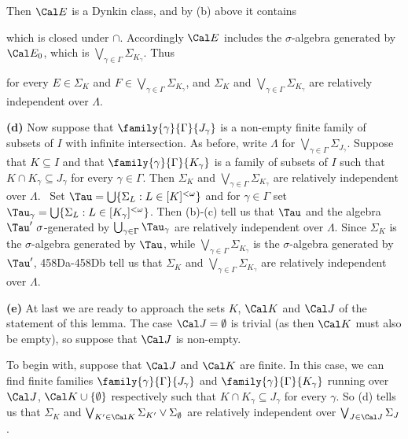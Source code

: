 {\noindent Then $\Cal E$ is a Dynkin class, and by (b) above it contains


\noindent which is closed under $\cap$.
Accordingly $\Cal E$ includes the $\sigma$-algebra generated by
$\Cal E_0$, which is $\bigvee_{\gamma\in\Gamma}\Sigma_{K_{\gamma}}$.
Thus


\noindent for every $E\in\Sigma_K$ and
$F\in\bigvee_{\gamma\in\Gamma}\Sigma_{K_{\gamma}}$, and
$\Sigma_K$ and
$\bigvee_{\gamma\in\Gamma}\Sigma_{K_{\gamma}}$ are relatively independent
over $\Lambda$.\ \Qed

\medskip

{\bf (d)} Now suppose that $\family{\gamma}{\Gamma}{J_{\gamma}}$ is a
non-empty
finite family of subsets of $I$ with infinite intersection.   As before,
write $\Lambda$ for $\bigvee_{\gamma\in\Gamma}\Sigma_{J_{\gamma}}$.
Suppose that $K\subseteq I$ and that
$\family{\gamma}{\Gamma}{K_{\gamma}}$ is a family of subsets of $I$ such
that $K\cap K_{\gamma}\subseteq J_{\gamma}$ for every $\gamma\in\Gamma$.
Then $\Sigma_K$ and $\bigvee_{\gamma\in\Gamma}\Sigma_{K_{\gamma}}$ are
relatively independent over $\Lambda$.
\Prf\ Set $\Tau=\bigcup\{\Sigma_L:L\in[K]^{<\omega}\}$ and
for $\gamma\in\Gamma$ set
$\Tau_{\gamma}=\bigcup\{\Sigma_L:L\in[K_{\gamma}]^{<\omega}\}$.
Then (b)-(c) tell us that $\Tau$ and the algebra
$\Tau'\,\,\sigma$-generated by
$\bigcup_{\gamma\in\Gamma}\Tau_{\gamma}$ are relatively independent over
$\Lambda$.
Since $\Sigma_K$ is the $\sigma$-algebra
generated by $\Tau$, while $\bigvee_{\gamma\in\Gamma}\Sigma_{K_{\gamma}}$
is the $\sigma$-algebra generated by $\Tau'$,
458Da-458Db tell us that $\Sigma_K$ and
$\bigvee_{\gamma\in\Gamma}\Sigma_{K_{\gamma}}$ are relatively independent
over $\Lambda$.\ \Qed

\medskip

{\bf (e)} At last we are ready to approach the sets $K$, $\Cal K$ and
$\Cal J$ of the statement of this lemma.   The case $\Cal J=\emptyset$
is trivial (as then $\Cal K$ must also be empty), so suppose that $\Cal J$
is non-empty.

\medskip

 To begin with, suppose that $\Cal J$ and $\Cal K$ are
finite.   In this case, we can find finite families
$\family{\gamma}{\Gamma}{J_{\gamma}}$ and
$\family{\gamma}{\Gamma}{K_{\gamma}}$ running over $\Cal J$,
$\Cal K\cup\{\emptyset\}$
respectively such that $K\cap K_{\gamma}\subseteq J_{\gamma}$ for every
$\gamma$.   So (d) tells us that $\Sigma_K$ and
$\bigvee_{K'\in\Cal K}\Sigma_{K'}\vee\Sigma_{\emptyset}$ are relatively
independent over $\bigvee_{J\in\Cal J}\Sigma_J$.

}
